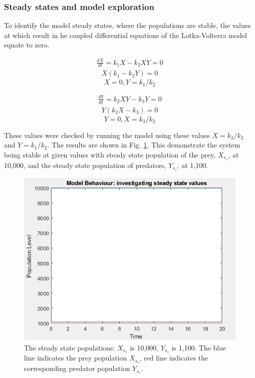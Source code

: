 \documentclass{article}
\begin{document}
\subsubsection{Steady states and model exploration}
To identify the model steady states, where the populations are stable, the values at which result in he coupled differential equations of the Lotka-Volterra model equate to zero. 

\begin{eqnarray*}
    \frac{dX}{dt} = k_1X - k_2XY = 0 
\end{eqnarray*}
\begin{eqnarray*}
    X ( k_1 - k_2Y ) = 0  
\end{eqnarray*}
\begin{equation}
    X = 0, Y = k_1 / k_2
\end{equation}

\begin{eqnarray*}
     \frac{dY}{dt} = k_2XY - k_3Y = 0
\end{eqnarray*}
\begin{eqnarray*}
   Y ( k_2X - k_3 ) = 0
\end{eqnarray*}
\begin{equation}
    Y = 0, X = k_3 / k_2
\end{equation}

These values were checked by running the model using these values $X = k_3 / k_2$ and $Y = k_1 / k_2$. The results are shown in Fig. \ref{fig:steady_states}. This demonstrate the system being stable at given values with steady state population of the prey, $X_s_s$, at 10,000, and the steady state population of predators, $Y_s_s$, at 1,100.

\begin{figure}[H]
    \includegraphics[width=\textwidth]{steady_state.PNG}
    \caption{The steady state populations: $X_s_s$ is 10,000, $Y_s_s$ is 1,100. The blue line indicates the prey population $X_s_s$, red line indicates the corresponding predator population $Y_s_s$.}
    \label{fig:steady_states}
\end{figure}
\end{document}
